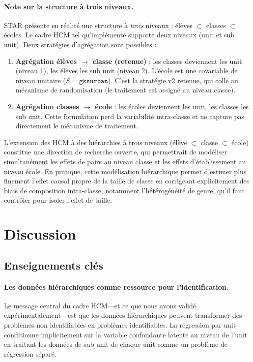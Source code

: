 \documentclass[11pt,a4paper]{article}
\begin{document}
\paragraph{Note sur la structure à trois niveaux.}
STAR présente en réalité une structure à \emph{trois} niveaux : élèves $\subset$ classes $\subset$ écoles. Le cadre HCM tel qu'implémenté supporte deux niveaux (unit et sub unit). Deux stratégies d'agrégation sont possibles :
\begin{enumerate}
  \item \textbf{Agrégation élèves $\to$ classe (retenue)} : les classes deviennent les unit (niveau 1), les élèves les sub unit (niveau 2). L'école est une covariable de niveau unitaire ($S = \texttt{gksurban}$). C'est la stratégie v2 retenue, qui colle au mécanisme de randomisation (le traitement est assigné au niveau classe).
  \item \textbf{Agrégation classes $\to$ école} : les écoles deviennent les unit, les classes les sub unit. Cette formulation perd la variabilité intra-classe et ne capture pas directement le mécanisme de traitement.
\end{enumerate}
L'extension des HCM à des hiérarchies à trois niveaux (élève $\subset$ classe $\subset$ école) constitue une direction de recherche ouverte, qui permettrait de modéliser simultanément les effets de pairs au niveau classe et les effets d'établissement au niveau école.
En pratique, cette modélisation hiérarchique permet d'estimer plus finement l'effet causal propre de la taille de classe en corrigeant explicitement des biais de composition intra-classe, notamment l'hétérogénéité de genre, qu'il faut contrôler pour isoler l'effet de taille.

\section{Discussion}
\label{sec:discussion}

\subsection{Enseignements clés}

\paragraph{Les données hiérarchiques comme ressource pour l'identification.}
Le message central du cadre HCM---et ce que nous avons validé expérimentalement---est que les données hiérarchiques peuvent transformer des problèmes non identifiables en problèmes identifiables.
La régression par unit conditionne implicitement sur la variable confondante latente au niveau de l'unit en traitant les données de sub unit de chaque unit comme un problème de régression séparé.
\end{document}
